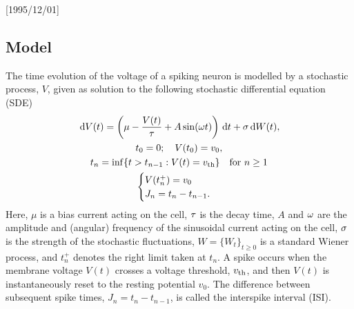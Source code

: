 \NeedsTeXFormat{LaTeX2e}[1995/12/01] \documentclass[10pt]{bmc_article}
\newenvironment{bmcformat}{\begin{raggedright}\baselineskip20pt\sloppy\setboolean{publ}{false}}{\end{raggedright}\baselineskip20pt\sloppy}
\begin{document}
\begin{bmcformat}
\section{Model}
The time evolution of the voltage of a spiking neuron is modelled by a
stochastic process, $V$, given as solution to the following stochastic
differential equation (SDE)
\begin{equation}
\begin{gathered}
\, \mathrm{d} V(t) = \left({\mu } - \frac{V(t)}{{\tau}} +  A \sin({\omega} t ) \right) \, \mathrm{d} t + {\sigma }
\, \mathrm{d} W(t),
\\
t_0 = 0; \quad V(t_0) = v_0,
\\
t_{n } = \inf \{ t > t_{n-1} : V(t) = { v_{\textrm{th} } } \} \quad \text{for } n \geq 1
\\
\begin{cases}
V(t_n^+) = v_0 &  
\\
J_n = t_n-t_{n-1} .
\end{cases}
\end{gathered}
\label{eq:v_evolution_uo}
\end{equation}
Here, $\mu$ is a bias current acting on the cell, ${\tau}$ is the decay time, $A$
and ${\omega}$ are the amplitude and (angular) frequency of the sinusoidal current
acting on the cell, ${\sigma }$ is the strength of the stochastic fluctuations, $W =
\{W_t\}_{t\geq0}$ is a standard Wiener process, and $t_n^+$ denotes the right
limit taken at $t_n$. A spike occurs when the membrane voltage $V(t)$ crosses a
voltage threshold, ${ v_{\textrm{th} } }$, and then $V(t)$ is instantaneously reset to the
resting potential $v_0$. The difference between subsequent spike times, $J_n =
t_{n} - t_{n-1}$, is called the interspike interval (ISI).


\end{bmcformat}
\end{document}
